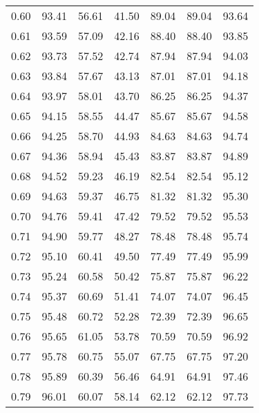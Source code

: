 \begin{tabular}{|c|c|c|c|c|c|c|}
      0.60 &     93.41 &     56.61 &      41.50 &   89.04 &      89.04 &         93.64 \\
      0.61 &     93.59 &     57.09 &      42.16 &   88.40 &      88.40 &         93.85 \\
      0.62 &     93.73 &     57.52 &      42.74 &   87.94 &      87.94 &         94.03 \\
      0.63 &     93.84 &     57.67 &      43.13 &   87.01 &      87.01 &         94.18 \\
      0.64 &     93.97 &     58.01 &      43.70 &   86.25 &      86.25 &         94.37 \\
      0.65 &     94.15 &     58.55 &      44.47 &   85.67 &      85.67 &         94.58 \\
      0.66 &     94.25 &     58.70 &      44.93 &   84.63 &      84.63 &         94.74 \\
      0.67 &     94.36 &     58.94 &      45.43 &   83.87 &      83.87 &         94.89 \\
      0.68 &     94.52 &     59.23 &      46.19 &   82.54 &      82.54 &         95.12 \\
      0.69 &     94.63 &     59.37 &      46.75 &   81.32 &      81.32 &         95.30 \\
      0.70 &     94.76 &     59.41 &      47.42 &   79.52 &      79.52 &         95.53 \\
      0.71 &     94.90 &     59.77 &      48.27 &   78.48 &      78.48 &         95.74 \\
      0.72 &     95.10 &     60.41 &      49.50 &   77.49 &      77.49 &         95.99 \\
      0.73 &     95.24 &     60.58 &      50.42 &   75.87 &      75.87 &         96.22 \\
      0.74 &     95.37 &     60.69 &      51.41 &   74.07 &      74.07 &         96.45 \\
      0.75 &     95.48 &     60.72 &      52.28 &   72.39 &      72.39 &         96.65 \\
      0.76 &     95.65 &     61.05 &      53.78 &   70.59 &      70.59 &         96.92 \\
      0.77 &     95.78 &     60.75 &      55.07 &   67.75 &      67.75 &         97.20 \\
      0.78 &     95.89 &     60.39 &      56.46 &   64.91 &      64.91 &         97.46 \\
      0.79 &     96.01 &     60.07 &      58.14 &   62.12 &      62.12 &         97.73 \\

\end{tabular}
